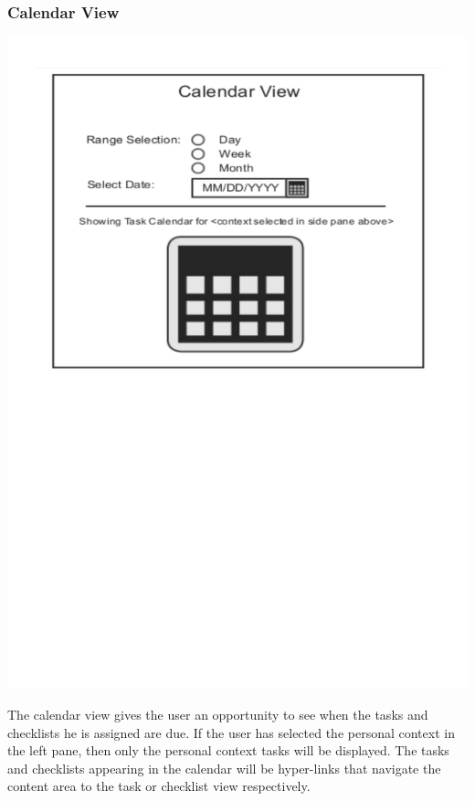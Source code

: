 \documentclass{article}
\begin{document}
\subsubsection{Calendar View}
\begin{center}
\includegraphics[trim = 0cm 14cm 0cm 0cm, clip=true, scale=0.7]{images/calendarview}
\end{center}
The calendar view gives the user an opportunity to see when the tasks and checklists he is assigned are due.
If the user has selected the personal context in the left pane, then only the personal context tasks will be displayed.
The tasks and checklists appearing in the calendar will be hyper-links that navigate the content area to the task or checklist view respectively.
\end{document}
